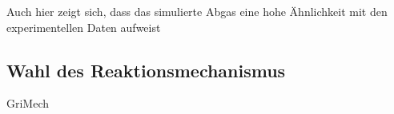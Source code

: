 \documentclass[footmark=none]{tubaf-thesis}
\begin{document}
        Auch hier zeigt sich, dass das simulierte Abgas eine hohe Ähnlichkeit mit den experimentellen Daten aufweist
        \subsection{Wahl des Reaktionsmechanismus} 
            GriMech
    \pagebreak
    \printbibliography[heading=bibintoc,title=Quellenverzeichnis]
\end{document}
